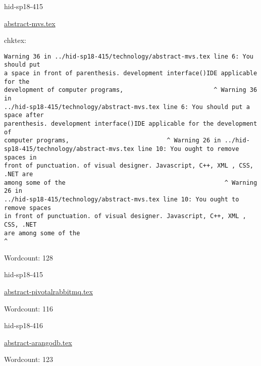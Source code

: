 \begin{IU}

hid-sp18-415

\href{https://github.com/cloudmesh-community/hid-sp18-415/blob/master//technology/abstract-mvs.tex}{abstract-mvs.tex}

 
chktex:
\begin{tiny}
\begin{verbatim}
Warning 36 in ../hid-sp18-415/technology/abstract-mvs.tex line 6: You should put
a space in front of parenthesis. development interface()IDE applicable for the
development of computer programs,                         ^ Warning 36 in
../hid-sp18-415/technology/abstract-mvs.tex line 6: You should put a space after
parenthesis. development interface()IDE applicable for the development of
computer programs,                           ^ Warning 26 in ../hid-
sp18-415/technology/abstract-mvs.tex line 10: You ought to remove spaces in
front of punctuation. of visual designer. Javascript, C++, XML , CSS, .NET are
among some of the                                            ^ Warning 26 in
../hid-sp18-415/technology/abstract-mvs.tex line 10: You ought to remove spaces
in front of punctuation. of visual designer. Javascript, C++, XML , CSS, .NET
are among some of the                                                   ^
\end{verbatim}
\end{tiny}

Wordcount: 128

\end{IU}



\begin{IU}

hid-sp18-415

\href{https://github.com/cloudmesh-community/hid-sp18-415/blob/master//technology/abstract-pivotalrabbitmq.tex}{abstract-pivotalrabbitmq.tex}

 

Wordcount: 116

\end{IU}



\begin{IU}

hid-sp18-416

\href{https://github.com/cloudmesh-community/hid-sp18-416/blob/master//technology/abstract-arangodb.tex}{abstract-arangodb.tex}

 

Wordcount: 123

\end{IU}

